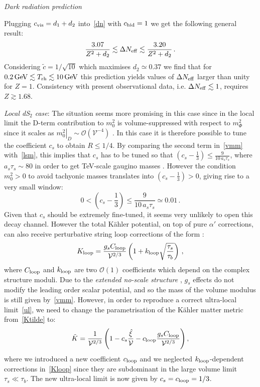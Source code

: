 \documentclass[11pt,a4paper]{article}
\newcommand{\be}{\begin{equation}}
\newcommand{\ee}{\end{equation}}
\newcommand\vo{{\mathcal{V}}}
\newcommand{\mc}{\mathcal}
\begin{document}
\textit{Dark radiation prediction}

Plugging $c_{\rm vis} = d_1 + d_2$ into~\eqref{dn} with $c_{\rm hid}=1$ we get the following general result:
\be
\frac{3.07}{Z^2 + d_2}\lesssim \Delta N_{\rm eff}\lesssim  \frac{3.20}{Z^2 + d_2}\,.
\label{dS1pred}
\ee
Considering $\tilde{c} = 1/\sqrt{10}$ which maximises $d_2 \simeq 0.37$ we find that for $0.2 \, {\rm GeV} \lesssim T_{\rm rh} \lesssim 10 \, {\rm GeV}$ this prediction yields values of $\Delta N_{\rm eff}$ larger than unity for $Z = 1$. Consistency with present observational data, i.e. $\Delta N_{\rm eff}\lesssim 1$, requires $Z\gtrsim 1.68$.

\item \emph{Local dS$_2$ case}: The situation seems more promising in this case since in the local limit the D-term contribution to $m_0^2$ is volume-suppressed with respect to $m_\Phi^2$ since it scales as $\left. m_0^2\right|_D \sim \mc{O}\left(\vo^{-4}\right)$ \cite{SoftTermsSeqLVS}. In this case it is therefore possible to tune the coefficient $c_s$ to obtain $R\leq 1/4$. By comparing the second term in~\eqref{vmm} with~\eqref{lsm}, this implies that $c_s$ has to be tuned so that $\left(c_s - \frac 13\right) \leq \frac{9}{10 \, a_s \tau_s}$, where $a_s \tau_s \sim 80$ in order to get TeV-scale gaugino masses \cite{SoftTermsSeqLVS}. However the condition $m_0^2 > 0$ to avoid tachyonic masses translates into $\left(c_s - \frac 13\right)>0$, giving rise to a very small window: 
\be
0 < \left( c_s- \frac 13 \right) \leq \frac{9}{10 \, a_s \tau_s} \simeq 0.01\,.
\ee
Given that $c_s$ should be extremely fine-tuned, it seems very unlikely to open this decay channel. However the total K\"ahler potential, 
on top of pure $\alpha'$ corrections, can also receive perturbative string loop corrections of the form \cite{Berg:2007wt}:
\be
K_{\rm loop} = \frac{g_s C_{\rm loop}}{\vo^{2/3}}\left(1+ k_{\rm loop}\sqrt{\frac{\tau_s}{\tau_b}}\right)\,,
\label{Kloop}
\ee
where $C_{\rm loop}$ and $k_{\rm loop}$ are two $\mc{O}(1)$ coefficients which depend on the complex structure moduli. Due to the \textit{extended no-scale structure} \cite{extendednoscale}, $g_s$ effects do not modify the leading order scalar potential, and so the mass of the volume modulus is still given by~\eqref{vmm}. However, in order to reproduce a correct ultra-local limit~\eqref{ul}, we need to change the parametrisation of the K\"ahler matter metric from~\eqref{Ktilde} to:
\be
\tilde{K} = \frac{1}{\vo^{2/3}} \left(1 - c_s \frac{\hat{\xi}}{\vo} - c_{\rm loop} \frac{g_s C_{\rm loop}}{\vo^{2/3}} \right),
\label{newKtilde}
\ee
where we introduced a new coefficient $c_{\rm loop}$ and we neglected $k_{\rm loop}$-dependent corrections in~\eqref{Kloop} since they are subdominant in the large volume limit $\tau_s\ll\tau_b$. The new ultra-local limit is now given by $c_s = c_{\rm loop} = 1/3$. 
\end{document}
